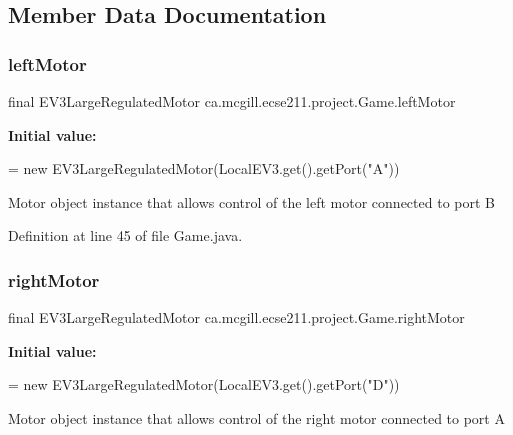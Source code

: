 \subsection{Member Data Documentation}
\mbox{\label{classca_1_1mcgill_1_1ecse211_1_1project_1_1_game_a40f6d5a8c70b88bf89b2171a02d2813f}} 
\subsubsection{\texorpdfstring{left\+Motor}{leftMotor}}
{\footnotesize\ttfamily final E\+V3\+Large\+Regulated\+Motor ca.\+mcgill.\+ecse211.\+project.\+Game.\+left\+Motor\hspace{0.3cm}{\ttfamily [static]}}

{\bfseries Initial value\+:}
\begin{DoxyCode}
=
      \textcolor{keyword}{new} EV3LargeRegulatedMotor(LocalEV3.get().getPort(\textcolor{stringliteral}{"A"}))
\end{DoxyCode}
Motor object instance that allows control of the left motor connected to port B 

Definition at line 45 of file Game.\+java.

\mbox{\label{classca_1_1mcgill_1_1ecse211_1_1project_1_1_game_a637614c1eb769dcdb09d897c66e453a2}} 
\subsubsection{\texorpdfstring{right\+Motor}{rightMotor}}
{\footnotesize\ttfamily final E\+V3\+Large\+Regulated\+Motor ca.\+mcgill.\+ecse211.\+project.\+Game.\+right\+Motor\hspace{0.3cm}{\ttfamily [static]}}

{\bfseries Initial value\+:}
\begin{DoxyCode}
=
      \textcolor{keyword}{new} EV3LargeRegulatedMotor(LocalEV3.get().getPort(\textcolor{stringliteral}{"D"}))
\end{DoxyCode}
Motor object instance that allows control of the right motor connected to port A 

